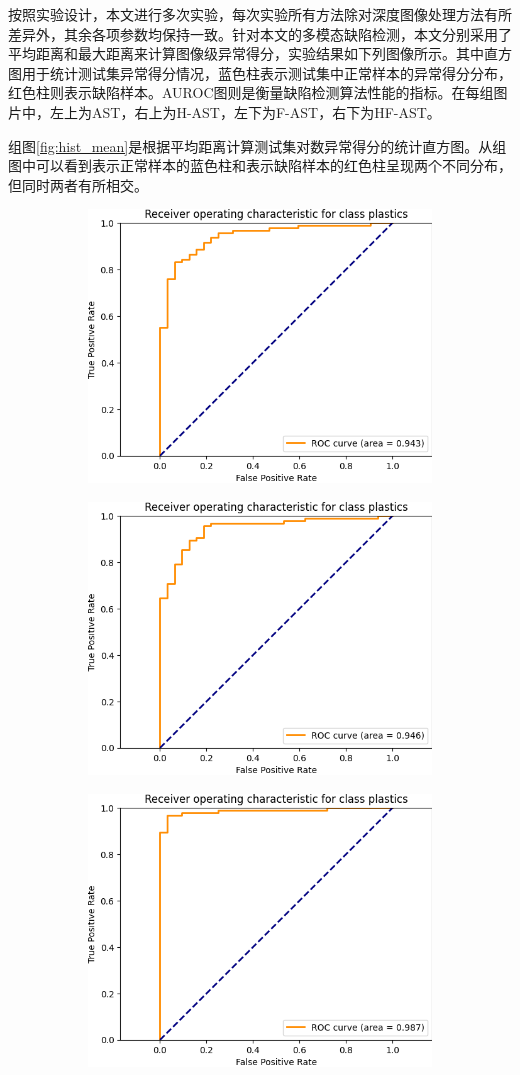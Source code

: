 按照实验设计，本文进行多次实验，每次实验所有方法除对深度图像处理方法有所差异外，其余各项参数均保持一致。针对本文的多模态缺陷检测，本文分别采用了平均距离和最大距离来计算图像级异常得分，实验结果如下列图像所示。其中直方图用于统计测试集异常得分情况，蓝色柱表示测试集中正常样本的异常得分分布，红色柱则表示缺陷样本。AUROC图则是衡量缺陷检测算法性能的指标。在每组图片中，左上为AST，右上为H-AST，左下为F-AST，右下为HF-AST。

组图\ref{fig:hist_mean}是根据平均距离计算测试集对数异常得分的统计直方图。从组图中可以看到表示正常样本的蓝色柱和表示缺陷样本的红色柱呈现两个不同分布，但同时两者有所相交。

\begin{figure}[htbp]
    \centering
    \begin{subfigure}
        \centering
        \includegraphics[width=.4\linewidth]{figures/4/auroc/ori_experiment/plastics_mean.png}  
        \end{subfigure}
        \begin{subfigure}
        \centering
        \includegraphics[width=.4\linewidth]{figures/4/auroc/hog_experiment/plastics_mean.png} 
        \end{subfigure}
        \begin{subfigure}
        \centering
        \includegraphics[width=.4\linewidth]{figures/4/auroc/mix_experiment/plastics_mean.png} 

\end{subfigure}
\end{figure}
